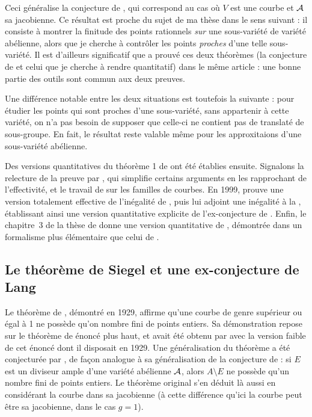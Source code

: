 Ceci généralise la conjecture de , qui correspond au cas où $V$
est une courbe et $\mathcal A$ sa jacobienne. Ce résultat est proche du sujet de ma
thèse dans le sens suivant : il consiste à montrer la finitude des points
rationnels \emph{sur} une sous-variété de variété abélienne, alors que je
cherche à contrôler les points \emph{proches} d'une telle sous-variété. Il est
d'ailleurs significatif que  a prouvé ces deux théorèmes (la
conjecture de  et celui que je cherche à rendre quantitatif)
dans le même article : une bonne partie des outils sont commun aux deux
preuves.

Une différence notable entre les deux situations est toutefois la suivante :
pour étudier les points qui sont proches d'une sous-variété, sans appartenir
à cette variété, on n'a pas besoin de supposer que celle-ci ne contient pas de
translaté de sous-groupe. En fait, le résultat reste valable même pour les
approxitaions d'une sous-variété abélienne.

Des versions quantitatives du théorème 1 de \cite{falda} ont été établies
ensuite. Signalons la relecture de la preuve par , qui simplifie
certains arguments en les rapprochant de l'effectivité, et le travail de
 sur les familles de courbes. En 1999,  prouve une
version totalement effective de l'inégalité de , puis lui adjoint
une inégalité à la , établissant ainsi une version quantitative
explicite de l'ex-conjecture de . Enfin, le chapitre~3 de la
thèse de  \cite{farhith} donne une version quantitative de
, démontrée dans un formalisme plus élémentaire que celui de
.

\subsection{Le théorème de Siegel et une ex-conjecture de Lang}
\label{s-siegel}

Le théorème de , démontré en 1929, affirme qu'une courbe de genre
supérieur ou égal à 1 ne possède qu'on nombre fini de points entiers. Sa
démonstration repose sur le théorème de  énoncé plus haut, et avait
été obtenu par  avec la version faible de cet énoncé dont il
disposait en 1929.  Une généralisation du théorème a été conjecturée par
, de façon analogue à sa généralisation de la conjecture de
 : si $E$ est un diviseur ample d'une variété abélienne $\mathcal A$,
alors $A \setminus E$ ne possède qu'un nombre fini de points entiers. Le
théorème original s'en déduit là aussi en considérant la courbe dans sa
jacobienne (à cette différence qu'ici la courbe peut être sa jacobienne, dans
le cas $g=1$).

